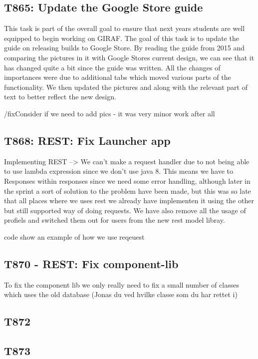 \subsection{T865: Update the Google Store guide}

This task is part of the overall goal to ensure that next years students are
well equipped to begin working on GIRAF. The goal of this task is to update the
guide on releasing builds to Google Store. By reading the guide from 2015 and
comparing the pictures in it with Google Stores current design, we can see that
it has changed quite a bit since the guide was written. All the changes of
importances were due to additional tabs which moved various parts of the functionality.
We then updated the pictures and along with the relevant part of text to better 
reflect the new design.

/fix{Consider if we need to add pics - it was very minor work after all}{}

\subsection{T868: REST: Fix Launcher app}
Implementing REST --> We can't make a request handler due to not being able
to use lambda expression since we don't use java 8.
This means we have to Responses within responses since we need some error
handling, although later in the sprint a sort of solution to the problem have
been made, but this was so late that all places where we uses rest we already
have implementen it using the other but still supported way of doing requests.
We have also remove all the usage of profiels and switched them out for users
from the new rest model libray.

code show an example of how we use reqeuest

\subsection{T870 - REST: Fix component-lib}
To fix the component lib we only really need to fix a small number of classes
which uses the old database (Jonas du ved hvilke classe som du har rettet i)

\subsection{T872}

\subsection{T873}


